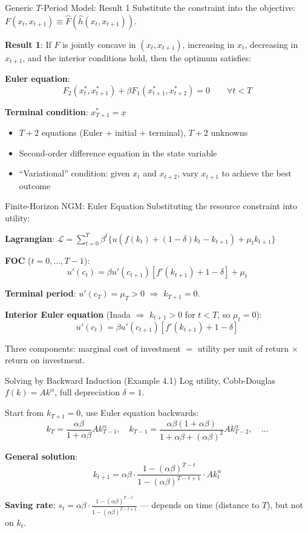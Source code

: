 \documentclass[blue]{beamer}
\begin{document}
\begin{frame}{Generic $T$-Period Model: Result 1}
	Substitute the constraint into the objective: $F(x_t, x_{t+1}) \equiv \hat{F}(\hat{h}(x_t, x_{t+1}))$.

	\textbf{Result 1}: If $F$ is jointly concave in $(x_t, x_{t+1})$, increasing in $x_t$, decreasing in $x_{t+1}$, and the interior conditions hold, then the optimum satisfies:
	
	\textbf{Euler equation}:
	\[
	F_2(x_t^*, x_{t+1}^*) + \beta F_1(x_{t+1}^*, x_{t+2}^*) = 0 \qquad \forall t < T
	\]
	
	\textbf{Terminal condition}: $x_{T+1}^* = \underline{x}$
	
	
	\begin{itemize}
		\item $T+2$ equations (Euler $+$ initial $+$ terminal), $T+2$ unknowns
		\item Second-order difference equation in the state variable
		\item ``Variational'' condition: given $x_t$ and $x_{t+2}$, vary $x_{t+1}$ to achieve the best outcome
	\end{itemize}
\end{frame}

\begin{frame}{Finite-Horizon NGM: Euler Equation}
	Substituting the resource constraint into utility:
	
	\textbf{Lagrangian}: $\mathcal{L} = \sum_{t=0}^T \beta^t \{u(f(k_t) + (1-\delta)k_t - k_{t+1}) + \mu_t k_{t+1}\}$
	
	\bigskip
	\textbf{FOC} ($t = 0, \ldots, T-1$):
	\[
	u'(c_t) = \beta u'(c_{t+1})[f'(k_{t+1}) + 1 - \delta] + \mu_t
	\]
	
	\textbf{Terminal period}: $u'(c_T) = \mu_T > 0$ $\Rightarrow$ $k_{T+1} = 0$.
	
	\bigskip
	\textbf{Interior Euler equation} (Inada $\Rightarrow$ $k_{t+1} > 0$ for $t < T$, so $\mu_t = 0$):
	\[
	u'(c_t) = \beta u'(c_{t+1})[f'(k_{t+1}) + 1 - \delta]
	\]
	
	Three components: marginal cost of investment $=$ utility per unit of return $\times$ return on investment.
\end{frame}

\begin{frame}{Solving by Backward Induction (Example 4.1)}
	Log utility, Cobb-Douglas $f(k) = Ak^\alpha$, full depreciation $\delta = 1$.
	
	\bigskip
	Start from $k_{T+1} = 0$, use Euler equation backwards:
	\[
	k_{T} = \frac{\alpha\beta}{1+\alpha\beta} Ak_{T-1}^\alpha, \quad k_{T-1} = \frac{\alpha\beta(1+\alpha\beta)}{1+\alpha\beta+(\alpha\beta)^2} Ak_{T-2}^\alpha, \quad \ldots
	\]
	
	\textbf{General solution}:
	\[
	k_{t+1} = \alpha\beta \cdot \frac{1-(\alpha\beta)^{T-t}}{1-(\alpha\beta)^{T-t+1}} \cdot Ak_t^\alpha
	\]
	
	\textbf{Saving rate}: $s_t = \alpha\beta \cdot \frac{1-(\alpha\beta)^{T-t}}{1-(\alpha\beta)^{T-t+1}}$ --- depends on time (distance to $T$), but not on $k_t$.
\end{frame}
\end{document}
